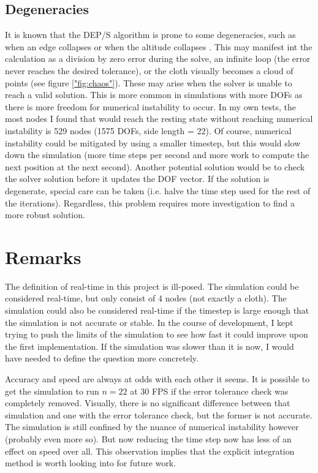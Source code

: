 \documentclass[letterpaper, 10 pt, conference]{ieeeconf}  %
\begin{document}
\subsection{Degeneracies}
        It is known that the DEP/S algorithm is prone to some degeneracies, such as when an edge collapses or when the altitude collapses \cite{Tamstorf2013discrete}. This may manifest int the calculation as a division by zero error during the solve, an infinite loop (the error never reaches the desired tolerance), or the cloth visually becomes a cloud of points (see figure \ref{"fig:chaos"}). These may arise when the solver is unable to reach a valid solution. This is more common in simulations with more DOFs as there is more freedom for numerical instability to occur. In my own tests, the most nodes I found that would reach the resting state without reaching numerical instability is 529 nodes (1575 DOFs, side length = 22). Of course, numerical instability could be mitigated by using a smaller timestep, but this would slow down the simulation (more time steps per second and more work to compute the next position at the next second). Another potential solution would be to check the solver solution before it updates the DOF vector. If the solution is degenerate, special care can be taken (i.e. halve the time step used for the rest of the iterations). Regardless, this problem requires more investigation to find a more robust solution.

\section{Remarks}
        The definition of real-time in this project is ill-posed. The simulation could be considered real-time, but only consist of 4 nodes (not exactly a cloth). The simulation could also be considered real-time if the timestep is large enough that the simulation is not accurate or stable. In the course of development, I kept trying to push the limits of the simulation to see how fast it could improve upon the first implementation. If the simulation was slower than it is now, I would have needed to define the question more concretely. 

        Accuracy and speed are always at odds with each other it seems. It is possible to get the simulation to run $n=22$ at 30 FPS if the error tolerance check was completely removed. Visually, there is no significant difference between that simulation and one with the error tolerance check, but the former is not accurate. The simulation is still confined by the nuance of numerical instability however (probably even more so). But now reducing the time step now has less of an effect on speed over all. This observation implies that the explicit integration method is worth looking into for future work.
\end{document}

